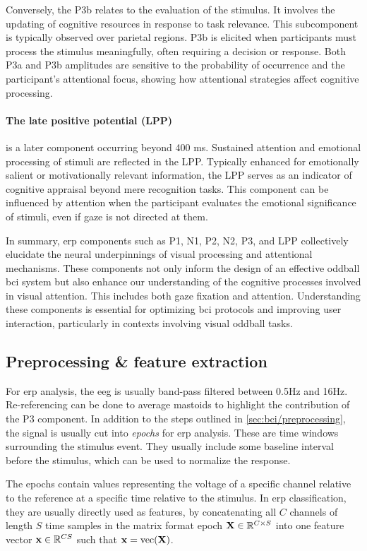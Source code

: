 Conversely, the P3b relates to the evaluation of the stimulus.
It involves the updating of cognitive resources in response to task relevance.
This subcomponent is typically observed over parietal regions.
P3b is elicited when participants must process the stimulus meaningfully, often
requiring a decision or response.
Both P3a and P3b amplitudes are sensitive to the probability of occurrence and the
participant's attentional focus, showing how attentional strategies affect cognitive
processing.

\paragraph{The late positive potential (LPP)} is a later component occurring beyond 400 ms.
Sustained attention and emotional processing of stimuli are reflected in the LPP.
Typically enhanced for emotionally salient or motivationally relevant information, the
LPP serves as an indicator of cognitive appraisal beyond mere recognition tasks.
This component can be influenced by attention when the participant evaluates the
emotional significance of stimuli, even if gaze is not directed at them.

In summary, \ac{erp} components such as P1, N1, P2, N2, P3, and LPP collectively
elucidate the neural underpinnings of visual processing and attentional mechanisms.
These components not only inform the design of an effective oddball \ac{bci} system but
also enhance our understanding of the cognitive processes involved in visual attention.
This includes both gaze fixation and attention.
Understanding these components is essential for optimizing \ac{bci} protocols and
improving user interaction, particularly in contexts involving visual oddball tasks.


\subsection{Preprocessing \& feature extraction}
For \ac{erp} analysis, the \ac{eeg} is usually band-pass filtered between 0.5Hz and
16Hz.
Re-referencing can be done to average mastoids to highlight the contribution of the P3
component.
In addition to the steps outlined in \cref{sec:bci/preprocessing}, the signal is
usually cut into \emph{epochs} for \ac{erp} analysis.
These are time windows surrounding the stimulus event.
They usually include some baseline interval before the stimulus, which can be used to
normalize the response.

The epochs contain values representing the voltage of a specific channel relative to the
reference at a specific time relative to the stimulus.
In \ac{erp} classification, they are usually directly used as features, by concatenating
all $C$ channels of length $S$ time samples in the matrix format epoch
$\mathbf{X}\in\mathbb{R}^{C\times S}$ into one feature vector
$\mathbf{x}\in\mathbb{R}^{CS}$ such that $\mathbf{x} = \text{vec}(\mathbf{X})$.

